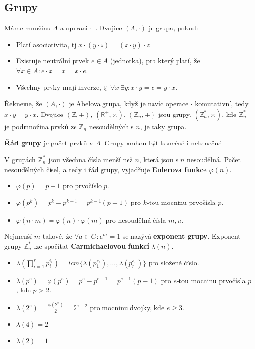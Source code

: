 \documentclass[10pt,a4paper]{article}
\begin{document}
\subsection{Grupy}
Máme množinu $A$ a operaci $\cdot$~. Dvojice $(A,\cdot)$ je grupa, pokud:
\begin{itemize}
\item Platí asociativita, tj $x\cdot(y\cdot z) = (x\cdot y)\cdot z$
\item Existuje neutrální prvek $e \in A$ (jednotka), pro který platí, že
$\forall x \in A: e\cdot x = x = x \cdot e$.
\item Všechny prvky mají inverze, tj $\forall x ~\exists y: x\cdot y = e = y
\cdot x$.
\end{itemize}
Řekneme, že $(A,\cdot)$ je Abelova grupa, když je navíc operace $\cdot$
komutativní, tedy $x\cdot y = y \cdot x$. Dvojice $(\mathbb{Z}, +)$,
$(\mathbb{R}^+, \times)$,  $(\mathbb{Z}_n, +)$ jsou grupy. $(\mathbb{Z}_n^*,
\times)$, kde $\mathbb{Z}_n^*$ je podmnožina prvků ze $\mathbb{Z}_n$
nesoudělných s $n$, je taky grupa.

\textbf{Řád grupy} je počet prvků v $A$. Grupy mohou být konečné i nekonečné.

V grupách $\mathbb{Z}_n^*$ jsou všechna čísla menší než $n$, která jsou s $n$
nesoudělná. Počet nesoudělných čísel, a tedy i řád grupy, vyjadřuje
\textbf{Eulerova funkce} $\varphi(n)$.
\begin{itemize}
\item $\varphi(p) = p-1$ pro prvočíslo $p$.
\item $\varphi(p^k) = p^k - p^{k-1} = p^{k-1}(p-1)$ pro $k$-tou mocninu
prvočísla $p$.
\item $\varphi(n\cdot m) = \varphi(n)\cdot\varphi(m)$ pro nesoudělná čísla
$m,n$.
\end{itemize}

Nejmenší $m$ takové, že $\forall a \in G: a^m = 1$ se nazývá \textbf{exponent
grupy}. Exponent grupy $\mathbb{Z}_n^*$ lze spočítat \textbf{Carmichaelovou
funkcí} $\lambda(n)$.
\begin{itemize}
\item $\lambda(\prod_{i=1}^r p_i^{e_i}) = lcm\{\lambda(p_1^{e_1}), \ldots,
\lambda(p_r^{e_r})\}$ pro složené číslo.
\item $\lambda(p^e) = \varphi(p^e) = p^e - p^{e-1} = p^{e-1}(p-1)$ pro $e$-tou
mocninu prvočísla $p$, kde $p > 2$.
\item $\lambda(2^e) = \frac{\varphi(2^e)}{2} = 2^{e - 2}$ pro mocninu dvojky,
kde $e \geq 3$.
\item $\lambda(4) = 2$
\item $\lambda(2) = 1$
\end{itemize}
\end{document}
